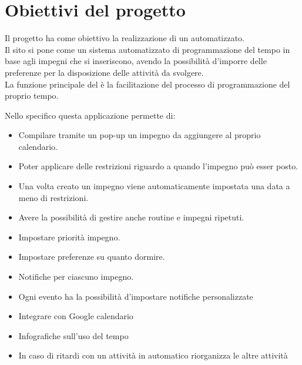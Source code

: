 \section{Obiettivi del progetto}
Il progetto ha come obiettivo la realizzazione di un \nome automatizzato.\\
Il sito si pone come un sistema automatizzato di programmazione del tempo in base agli impegni che si inseriscono, avendo la possibilità d'imporre delle preferenze per la disposizione delle attività da svolgere.\\
La funzione principale del \nome è la facilitazione del processo di programmazione del proprio tempo.

\vspace{0.5cm}

Nello specifico questa applicazione permette di:
\begin{itemize}
    \item Compilare tramite un pop-up un impegno da aggiungere al proprio calendario. 
    \item Poter applicare delle restrizioni riguardo a quando l'impegno può esser posto.
    \item Una volta creato un impegno viene automaticamente impostata una data a meno di restrizioni.
    \item Avere la possibilità di gestire anche routine e impegni ripetuti.
    \item Impostare priorità impegno.
    \item Impostare preferenze su quanto dormire.
    \item Notifiche per ciascuno impegno.
    \item Ogni evento ha la possibilità d'impostare notifiche personalizzate
    \item Integrare con Google calendario
    \item Infografiche sull'uso del tempo
    \item In caso di ritardi con un attività in automatico riorganizza le altre attività
\end{itemize}

